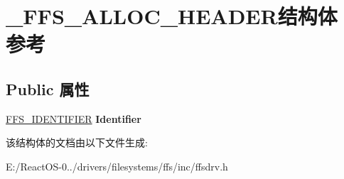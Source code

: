 \hypertarget{struct___f_f_s___a_l_l_o_c___h_e_a_d_e_r}{}\section{\+\_\+\+F\+F\+S\+\_\+\+A\+L\+L\+O\+C\+\_\+\+H\+E\+A\+D\+E\+R结构体 参考}
\label{struct___f_f_s___a_l_l_o_c___h_e_a_d_e_r}
\subsection*{Public 属性}
\begin{DoxyCompactItemize}
\item 
\mbox{\label{struct___f_f_s___a_l_l_o_c___h_e_a_d_e_r_acd40b1e425f56c1a5c6006a5b569a286}} 
\hyperlink{struct___f_f_s___i_d_e_n_t_i_f_i_e_r}{F\+F\+S\+\_\+\+I\+D\+E\+N\+T\+I\+F\+I\+ER} {\bfseries Identifier}
\end{DoxyCompactItemize}


该结构体的文档由以下文件生成\+:\begin{DoxyCompactItemize}
\item 
E\+:/\+React\+O\+S-\/0../drivers/filesystems/ffs/inc/ffsdrv.\+h\end{DoxyCompactItemize}
